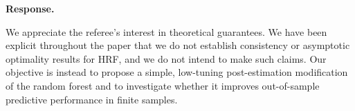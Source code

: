 \documentclass[12pt]{article}
\newcommand{\response}{\medskip\noindent\textbf{Response.}\ }
\begin{document}
\response


We appreciate the referee's interest in theoretical guarantees. We have been explicit throughout the paper that we do not establish consistency or asymptotic optimality results for HRF, and we do not intend to make such claims. Our objective is instead to propose a simple, low-tuning post-estimation modification of the random forest and to investigate whether it improves out-of-sample predictive performance in finite samples.
\end{document}
